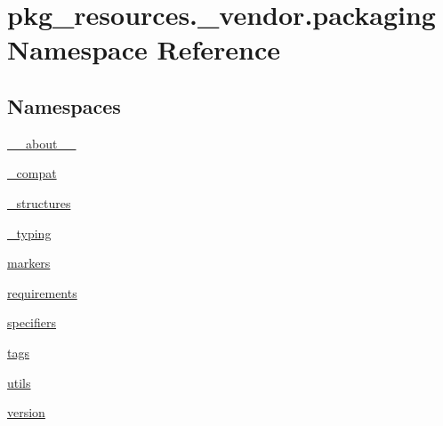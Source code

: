 \hypertarget{namespacepkg__resources_1_1__vendor_1_1packaging}{}\section{pkg\+\_\+resources.\+\_\+vendor.\+packaging Namespace Reference}
\label{namespacepkg__resources_1_1__vendor_1_1packaging}
\subsection*{Namespaces}
\begin{DoxyCompactItemize}
\item 
 \hyperlink{namespacepkg__resources_1_1__vendor_1_1packaging_1_1____about____}{\+\_\+\+\_\+about\+\_\+\+\_\+}
\item 
 \hyperlink{namespacepkg__resources_1_1__vendor_1_1packaging_1_1__compat}{\+\_\+compat}
\item 
 \hyperlink{namespacepkg__resources_1_1__vendor_1_1packaging_1_1__structures}{\+\_\+structures}
\item 
 \hyperlink{namespacepkg__resources_1_1__vendor_1_1packaging_1_1__typing}{\+\_\+typing}
\item 
 \hyperlink{namespacepkg__resources_1_1__vendor_1_1packaging_1_1markers}{markers}
\item 
 \hyperlink{namespacepkg__resources_1_1__vendor_1_1packaging_1_1requirements}{requirements}
\item 
 \hyperlink{namespacepkg__resources_1_1__vendor_1_1packaging_1_1specifiers}{specifiers}
\item 
 \hyperlink{namespacepkg__resources_1_1__vendor_1_1packaging_1_1tags}{tags}
\item 
 \hyperlink{namespacepkg__resources_1_1__vendor_1_1packaging_1_1utils}{utils}
\item 
 \hyperlink{namespacepkg__resources_1_1__vendor_1_1packaging_1_1version}{version}
\end{DoxyCompactItemize}
